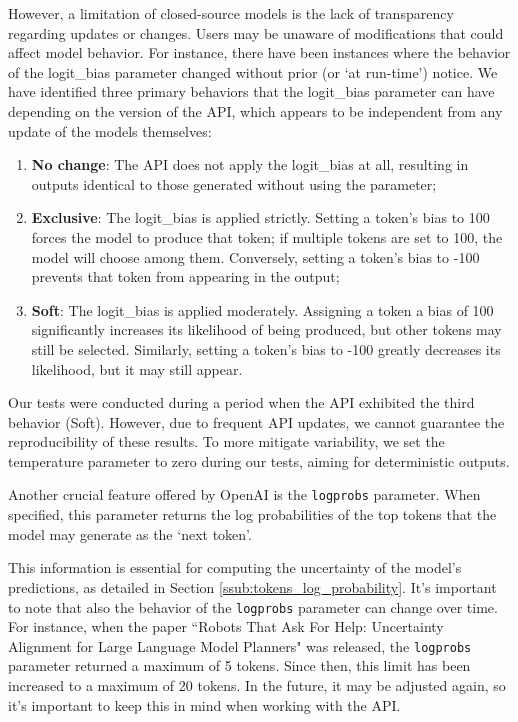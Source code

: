 However, a limitation of closed-source models is the lack of transparency
regarding updates or changes. Users may be unaware of modifications that could affect
model behavior. For instance, there have been instances where the behavior of the
logit\_bias parameter changed without prior (or `at run-time') notice. We have
identified three primary behaviors that the logit\_bias parameter can have
depending on the version of the API, which appears to be independent from any update
of the models themselves:
\begin{enumerate}
  \item \textbf{No change}: The API does not apply the logit\_bias at all,
    resulting in outputs identical to those generated without using the
    parameter;

  \item \textbf{Exclusive}: The logit\_bias is applied strictly. Setting a token's
    bias to 100 forces the model to produce that token; if multiple tokens are set
    to 100, the model will choose among them. Conversely, setting a token's bias
    to -100 prevents that token from appearing in the output;

  \item \textbf{Soft}: The logit\_bias is applied moderately. Assigning a token
    a bias of 100 significantly increases its likelihood of being produced, but other
    tokens may still be selected. Similarly, setting a token's bias to -100
    greatly decreases its likelihood, but it may still appear.
\end{enumerate}

Our tests were conducted during a period when the API exhibited the third behavior
(Soft). However, due to frequent API updates, we cannot guarantee the
reproducibility of these results. To more mitigate variability, we set the
temperature parameter to zero during our tests, aiming for deterministic outputs.

Another crucial feature offered by OpenAI is the \texttt{logprobs} parameter. When
specified, this parameter returns the log probabilities of the top tokens that
the model may generate as the `next token'.

This information is essential for computing the uncertainty of the model's
predictions, as detailed in Section \ref{ssub:tokens_log_probability}. It's
important to note that also the behavior of the \texttt{logprobs} parameter can change
over time. For instance, when the paper ``Robots That Ask For Help: Uncertainty
Alignment for Large Language Model Planners" was released, the \texttt{logprobs}
parameter returned a maximum of 5 tokens. Since then, this limit has been increased
to a maximum of 20 tokens. In the future, it may be adjusted again, so it's
important to keep this in mind when working with the API.

